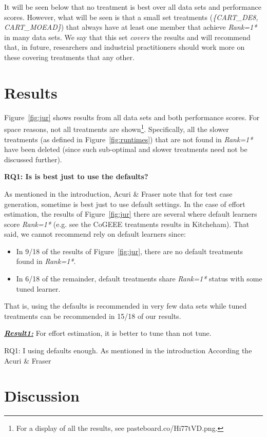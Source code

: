\documentclass[10pt,conference]{IEEEtran}
\newcommand{\bi}{\begin{itemize}}
\newcommand{\ei}{\end{itemize}}
\newcommand{\fig}[1]{Figure~\ref{fig:#1}}
\newenvironment{result}[2]
{\begin{myshadowbox}\textbf{\textit{\underline{Result#1:}}} #2}{ 
\end{myshadowbox}}
\begin{document}
It will be seen below that no treatment is best over all data sets and performance scores.  However, what will be seen is that a small set
treatments ({\em \{CART\_DE8, CART\_MOEAD\}}) that always have at least one
member  that achieve  {\em Rank=1*} in many data sets. 
We say that this set {\em covers} the results and will recommend that, in future, researchers and industrial practitioners should work more on these covering treatments that any other.

 

\section{Results}
 
 Figure~\ref{fig:jur} shows results from all
 data sets and both performance scores. For space reasons,
 not 
 all treatments are shown\footnote{ For a display of all the  results, see pasteboard.co/Hi77tVD.png.}. Specifically, all the slower treatments
 (as defined in \fig{runtimes}) that are not found in {\em Rank=1*} have been deleted (since such sub-optimal and slower
 treatments need not be discussed further).
 
 {\bf RQ1: Is is best just to use the defaults?}
 
 As mentioned in the introduction, 
 Acuri \& Fraser note that for
 test case generation, sometime   is best just
 to use default settings. In the case of effort estimation, the results of  Figure~\ref{fig:jur} there are several
 where default learners score {\em Rank=1*} (e.g. see the CoGEEE treatments results in Kitcheham).  That said,
 we cannot recommend rely on default learners since:
 \bi
 \item
In   9/18 of the results  of Figure~\ref{fig:jur}, there are
no default treatments found in  {\em Rank=1*}. 
 \item
 In 6/18 of the remainder, default
 treatments share {\em Rank=1*} status with some tuned learner.
 \ei
 That is, using the defaults is recommended in very few
 data sets while tuned treatments can be recommended
 in 15/18 of our results.
 
 \begin{result}{1}
 For effort estimation, it is better to tune than not tune.
 \end{result}
 
 

RQ1: I using defaults enough.
As mentioned in the introduction
According the Acuri \& Fraser

\section{Discussion}\label{sect:discussion}
\end{document}
